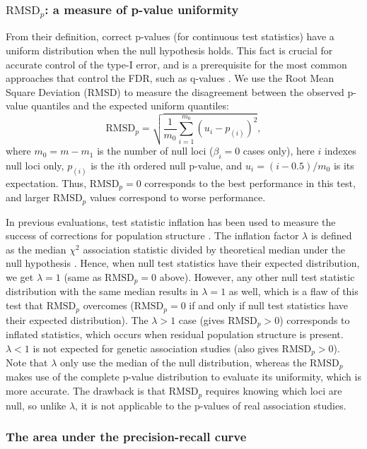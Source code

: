 \documentclass[11pt]{article}
\newcommand{\rmsd}{\text{RMSD}_p}
\begin{document}
\subsubsection{$\rmsd$: a measure of p-value uniformity}

From their definition, correct p-values (for continuous test statistics) have a uniform distribution when the null hypothesis holds.
This fact is crucial for accurate control of the type-I error, and is a prerequisite for the most common approaches that control the FDR, such as q-values \citep{storey_positive_2003, storey_statistical_2003}.
We use the Root Mean Square Deviation (RMSD) to measure the disagreement between the observed p-value quantiles and the expected uniform quantiles:
$$
\rmsd
=
\sqrt{ \frac{1}{m_0} \sum_{i = 1}^{m_0} \left( u_i - p_{(i)} \right)^2 },
$$
where
$m_0 = m - m_1$ is the number of null loci ($\beta_i = 0$ cases only),
here $i$ indexes null loci only,
$p_{(i)}$ is the $i$th ordered null p-value, and
$u_i = ( i - 0.5 ) / m_0$ is its expectation.
Thus, $\rmsd = 0$ corresponds to the best performance in this test, and larger $\rmsd$ values correspond to worse performance.

In previous evaluations, test statistic inflation has been used to measure the success of corrections for population structure \citep{astle_population_2009, price_new_2010}.
The inflation factor $\lambda$ is defined as the median $\chi^2$ association statistic divided by theoretical median under the null hypothesis \citep{devlin_genomic_1999}.
Hence, when null test statistics have their expected distribution, we get $\lambda = 1$ (same as $\rmsd = 0$ above).
However, any other null test statistic distribution with the same median results in $\lambda = 1$ as well, which is a flaw of this test that $\rmsd$ overcomes ($\rmsd = 0$ if and only if null test statistics have their expected distribution).
The $\lambda > 1$ case (gives $\rmsd > 0$) corresponds to inflated statistics, which occurs when residual population structure is present.
$\lambda < 1$ is not expected for genetic association studies (also gives $\rmsd > 0$).
Note that $\lambda$ only use the median of the null distribution, whereas the $\rmsd$ makes use of the complete p-value distribution to evaluate its uniformity, which is more accurate.
The drawback is that $\rmsd$ requires knowing which loci are null, so unlike $\lambda$, it is not applicable to the p-values of real association studies.

\subsubsection{The area under the precision-recall curve}
\end{document}
